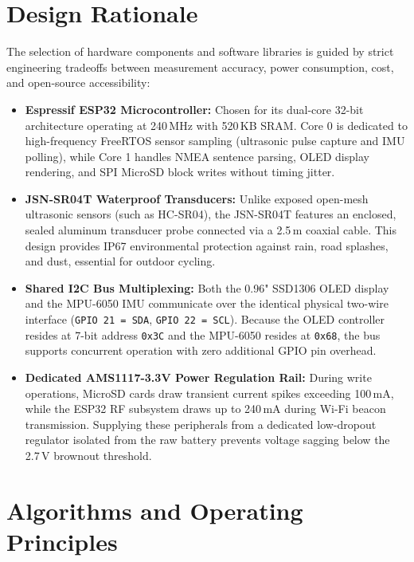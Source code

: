 \section{Design Rationale}
The selection of hardware components and software libraries is guided by strict engineering tradeoffs between measurement accuracy, power consumption, cost, and open-source accessibility:

\begin{itemize}
    \item \textbf{Espressif ESP32 Microcontroller:} Chosen for its dual-core 32-bit architecture operating at 240\,MHz with 520\,KB SRAM. Core 0 is dedicated to high-frequency FreeRTOS sensor sampling (ultrasonic pulse capture and IMU polling), while Core 1 handles NMEA sentence parsing, OLED display rendering, and SPI MicroSD block writes without timing jitter.
    \item \textbf{JSN-SR04T Waterproof Transducers:} Unlike exposed open-mesh ultrasonic sensors (such as HC-SR04), the JSN-SR04T features an enclosed, sealed aluminum transducer probe connected via a 2.5\,m coaxial cable. This design provides IP67 environmental protection against rain, road splashes, and dust, essential for outdoor cycling.
    \item \textbf{Shared I2C Bus Multiplexing:} Both the 0.96" SSD1306 OLED display and the MPU-6050 IMU communicate over the identical physical two-wire interface (\texttt{GPIO 21 = SDA}, \texttt{GPIO 22 = SCL}). Because the OLED controller resides at 7-bit address \texttt{0x3C} and the MPU-6050 resides at \texttt{0x68}, the bus supports concurrent operation with zero additional GPIO pin overhead.
    \item \textbf{Dedicated AMS1117-3.3V Power Regulation Rail:} During write operations, MicroSD cards draw transient current spikes exceeding 100\,mA, while the ESP32 RF subsystem draws up to 240\,mA during Wi-Fi beacon transmission. Supplying these peripherals from a dedicated low-dropout regulator isolated from the raw battery prevents voltage sagging below the 2.7\,V brownout threshold.
\end{itemize}

\section{Algorithms and Operating Principles}

